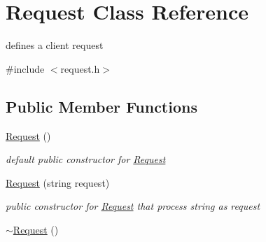 \hypertarget{classRequest}{\section{Request Class Reference}
\label{classRequest}
}


defines a client request  




{\ttfamily \#include $<$request.\-h$>$}

\subsection*{Public Member Functions}
\begin{DoxyCompactItemize}
\item 
\hypertarget{classRequest_afaf8d8928de7ffff8a3767589489bd33}{\hyperlink{classRequest_afaf8d8928de7ffff8a3767589489bd33}{Request} ()}\label{classRequest_afaf8d8928de7ffff8a3767589489bd33}

\begin{DoxyCompactList}\small\item\em default public constructor for \hyperlink{classRequest}{Request} \end{DoxyCompactList}\item 
\hyperlink{classRequest_a3b25fd1c24befd84e55ec36d012dfd29}{Request} (string request)
\begin{DoxyCompactList}\small\item\em public constructor for \hyperlink{classRequest}{Request} that process string as request \end{DoxyCompactList}\item 
\hypertarget{classRequest_a4d57c725686701f773eb3630630a7ea2}{\hyperlink{classRequest_a4d57c725686701f773eb3630630a7ea2}{$\sim$\-Request} ()}\label{classRequest_a4d57c725686701f773eb3630630a7ea2}


\end{DoxyCompactItemize}
